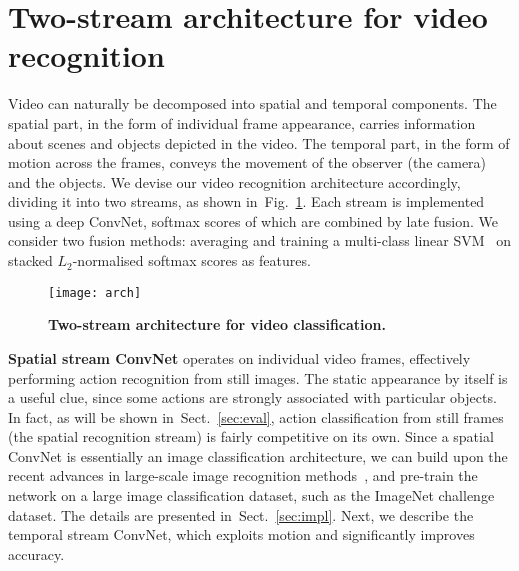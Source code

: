 \documentclass{article} \usepackage{nips14submit_e,times}
\newcommand{\figref}[1]{Fig.~\ref{#1}}
\newcommand{\sref}[1]{Sect.~\ref{#1}}
\begin{document}
\section{Two-stream architecture for video recognition}
\label{sec:arch}
Video can naturally be decomposed into spatial and temporal components. The spatial part, in the form of individual frame appearance, carries information about scenes and 
objects depicted in the video. The temporal part, in the form of motion across the frames, conveys the movement of the observer (the camera) and the objects. 
We devise our video recognition architecture accordingly, dividing it into two streams, as shown in~\figref{fig:arch}. Each stream is implemented using a deep ConvNet, 
softmax scores of which are combined by late fusion. We consider two fusion methods: averaging and training a multi-class linear SVM~\cite{Crammer01} on stacked $L_2$-normalised softmax scores
as features.
\begin{figure}[ht]
\centering
\texttt{[image: arch]}
\caption{\textbf{Two-stream architecture for video classification.}}
\label{fig:arch}
\end{figure}


\noindent\textbf{Spatial stream ConvNet} operates on individual video frames, effectively performing action recognition from still images.
The static appearance by itself is a useful clue, since some actions are strongly associated with particular objects. 
In fact, as will be shown in~\sref{sec:eval}, action classification from still frames (the spatial recognition stream) is fairly competitive on its own.
Since a spatial ConvNet is essentially an image classification architecture, we can build upon the recent advances in large-scale image recognition methods~\cite{Krizhevsky12},
and pre-train the network on a large image classification dataset, such as the ImageNet challenge dataset. The details are presented in~\sref{sec:impl}.
Next, we describe the temporal stream ConvNet, which exploits motion and significantly improves accuracy.
\end{document}
